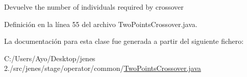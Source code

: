 \begin{DoxyReturn}{Devuelve}
the number of individuals required by crossover 
\end{DoxyReturn}


Definición en la línea 55 del archivo Two\-Points\-Crossover.\-java.



La documentación para esta clase fue generada a partir del siguiente fichero\-:\begin{DoxyCompactItemize}
\item 
C\-:/\-Users/\-Ayo/\-Desktop/jenes 2./src/jenes/stage/operator/common/\hyperlink{_two_points_crossover_8java}{Two\-Points\-Crossover.\-java}\end{DoxyCompactItemize}
